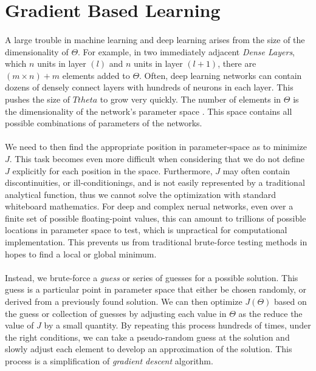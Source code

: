 \documentclass[12pt,letterpaper]{article}
\begin{document}

\section{Gradient Based Learning}

\paragraph*{}A large trouble in machine learning and deep learning arises from the size of the dimensionality of $\Theta$. For example, in two immediately adjacent \textit{Dense Layers}, which $n$ units in layer $(l)$ and $n$ units in layer $(l+1)$, there are $(m \times n) + m$ elements added to $\Theta$. Often, deep learning networks can contain dozens of densely connect layers with hundreds of neurons in each layer. This pushes the size of $Ttheta$ to grow very quickly. The number of elements in $\Theta$ is the dimensionality of the network's parameter space \cite{Goodfellow}. This space contains all possible combinations of parameters of the networks.

\paragraph*{}We need to then find the appropriate position in parameter-space as to minimize $J$. This task becomes even more difficult when considering that we do not define $J$ explicitly for each position in the space. Furthermore, $J$ may often contain discontinuities, or ill-conditionings, and is not easily represented by a traditional analytical function, thus we cannot solve the optimization with standard whiteboard mathematics. For deep and complex nerual networks, even over a finite set of possible floating-point values, this can amount to trillions of possible locations in parameter space to test, which is unpractical for computational implementation. This prevents us from traditional brute-force testing methods in hopes to find a local or global minimum. 

\paragraph*{}Instead, we brute-force a \textit{guess} or series of guesses for a possible solution. This guess is a particular point in parameter space that either be chosen randomly, or derived from a previously found solution. We can then optimize $J(\Theta)$ based on the guess or collection of guesses by adjusting each value in $\Theta$ as the reduce the value of $J$ by a small quantity. By repeating this process hundreds of times, under the right conditions, we can take a pseudo-random guess at the solution and slowly adjust each element to develop an approximation of the solution. This process is a simplification of \textit{gradient descent} algorithm.
\end{document}
